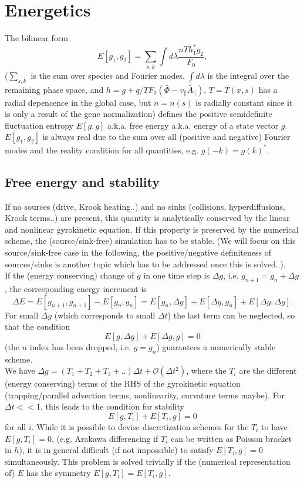 \documentclass[12pt]{article}
\begin{document}

\section{Energetics}
The bilinear form
$$E[g_1,g_2]=\sum_{s,k}\int d\lambda \frac{nTh_1^*g_2}{F_0},$$
($\sum_{s,k}$ is the sum over species and Fourier modes, $\int d\lambda$ is the integral over the 
remaining phase space, and $h=g+q/T F_0(\bar \Phi-v_\parallel \bar A_\parallel)$, $T=T(x,s)$ has a radial 
depencence in the global case, but $n=n(s)$ is radially constant since it is only a result of the gene 
normalization) defines the positive semidefinite fluctuation entropy $E[g,g]$ a.k.a. free energy a.k.a. 
energy of a state vector $g$. $E[g_1,g_2]$ is always real due to the sum over all (positive and negative) 
Fourier modes and the reality condition for all quantities, e.g. $g(-k)=g(k)^*$.\\

\subsection{Free energy and stability}
If no sources (drive, Krook heating..) and no sinks 
(collisions, hyperdiffusions, Krook terms..) are present, this quantity is analytically 
conserved by the linear and nonlinear 
gyrokinetic equation.  If this property is preserved 
by the numerical scheme, the (source/sink-free) simulation has to be stable. (We will focus on
this source/sink-free case in the following, the positive/negative definiteness of 
sources/sinks is another topic which has to be addressed once this is solved..).\\
If the (energy conserving) change of $g$ in one time step is $\Delta g$, 
i.e. $g_{n+1}=g_n+\Delta g$, the corresponding energy increment is 
$$\Delta E=E[g_{n+1},g_{n+1}]-E[g_n,g_n]=E[g_n,\Delta g]+E[\Delta g,g_n]+E[\Delta g,\Delta g].$$
For small $\Delta g$ (which corresponds to small $\Delta t$) the last term can be neglected, 
so that the condition 
$$E[g,\Delta g]+E[\Delta g,g]=0$$ (the $n$ index has been dropped, i.e. $g=g_n$) 
guarantees a numerically stable scheme.\\
We have $\Delta g=(T_1+T_2+T_3+..)\Delta t+\mathcal{O}(\Delta t^2)$, where the 
$T_i$ are the different (energy conserving) terms of the RHS of the gyrokinetic equation 
(trapping/parallel advection terms, nonlinearity, curvature terms maybe). For $\Delta t<<1$,
this leads to the condition for stability
$$E[g,T_i]+E[T_i,g]=0$$ for all $i$.
While it is possible to devise discretization schemes for the $T_i$ to have $E[g,T_i]=0$, 
(e.g. Arakawa differencing if $T_i$ can be written as Poisson bracket in $h$), it is in general 
difficult (if not impossible) to satisfy $E[T_i,g]=0$ simultaneously.
This problem is solved trivially if the (numerical representation of) $E$ has the symmetry $E[g,T_i]=E[T_i,g]$.\\
\end{document}
